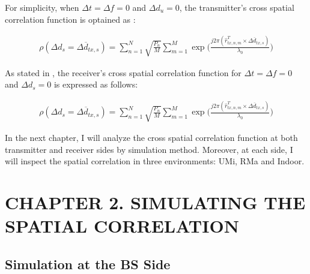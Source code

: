 \documentclass{article} %
\begin{document}
For simplicity, when $\Delta t = \Delta f = 0$ and $\Delta d_u = 0$, the transmitter’s cross spatial correlation function is optained as \cite{final_exam}:
\begin{adjustwidth}{-2cm}{0cm}
\begin{equation} \label{ptBS} 
\begin{split}
    \rho(\Delta d_s = \Delta \overline d_{tx,s}) = \sum_{n=1}^N \sqrt{\frac{P_n}{M}} \sum_{m=1}^M \exp \Big(\frac{j2\pi(\hat{r}_{tx,n,m}^T \times \Delta \overline{d}_{tx,s})}{\lambda_0} \Big)
\end{split}
\end{equation}
\end{adjustwidth}

As stated in \cite{final_exam}, the receiver’s cross spatial correlation function for $\Delta t = \Delta f = 0$ and $\Delta d_s = 0$ is expressed as follows:
\begin{adjustwidth}{-2cm}{0cm}
\begin{equation} \label{ptMS}
\begin{split}
    \rho(\Delta d_s = \Delta \overline d_{tx,s}) = \sum_{n=1}^N \sqrt{\frac{P_n}{M}} \sum_{m=1}^M \exp \Big(\frac{j2\pi(\hat{r}_{tx,n,m}^T \times \Delta \overline{d}_{tx,s})}{\lambda_0} \Big)
\end{split}
\end{equation}
\end{adjustwidth}

In the next chapter, I will analyze the cross spatial correlation function at both transmitter and receiver sides by simulation method. Moreover, at each side, I will inspect the spatial correlation in three environments: UMi, RMa and Indoor.

\clearpage

\section*{CHAPTER 2. SIMULATING THE SPATIAL CORRELATION}
\setcounter{section}{2}
\setcounter{figure}{0}
\setcounter{table}{0}
\setcounter{subsection}{0}

\subsection{Simulation at the BS Side}
\end{document}
